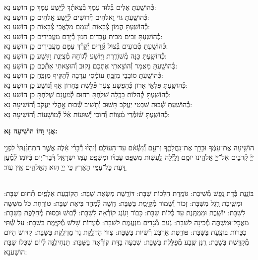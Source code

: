 \documentclass[twoside, openany, parskip=half, 11pt]{book}
\begin{document}
\begin{small}
כְּ֯הוֹשַֽׁעְתָּ אֵלִים בְּ֯לוּד עִמָּךְ בְּ֯צֵאתְ֯ךָ לְ֯יֵֽשַׁע עַמָּךְ \hfill כֵּן הוֹשַׁע נָא: \\
כְּ֯הוֹשַֽׁעְתָּ גּוֹי וֵאלֹהִים דְּ֯רוּשִׁים לְ֯יֵֽשַׁע אֱלֹהִים \hfill כֵּן הוֹשַׁע נָא: \\
כְּ֯הוֹשַֽׁעְתָּ הֲמוֹן צְ֯בָאוֹת וְ֯עִמָּם מַלְאֲכֵי צְ֯בָאוֹת \hfill כֵּן הוֹשַׁע נָא: \\
כְּ֯הוֹשַֽׁעְתָּ זַכִּים מִבֵּית עֲבָדִים חַנּוּן בְּ֯יָדָם מַעֲבִידִים \hfill כֵּן הוֹשַׁע נָא: \\
כְּ֯הוֹשַֽׁעְתָּ טְ֯בוּעִים בְּ֯צוּל גְּ֯זָרִים יְ֯קָרְ֯ךָ עִמָּם מַעֲבִירִים \hfill כֵּן הוֹשַׁע נָא: \\
כְּ֯הוֹשַֽׁעְתָּ כַּנָּה מְ֯שׁוֹרֶֽרֶת וַיּֽוֹשַׁע לְ֯גוֹחָהּ מְ֯צֻיֶּנֶת וַיִוָּֽשַׁע \hfill כֵּן הוֹשַׁע נָא: \\
כְּ֯הוֹשַֽׁעְתָּ מַאֲמַר וְ֯הוֹצֵאתִי אֶתְכֶם נָקוּב וְ֯הוּצֵאתִי אִתְּ֯כֶם \hfill כֵּן הוֹשַׁע נָא:\\
כְּ֯הוֹשַֽׁעְתָּ סוֹבֲבֵי מִזְבֵּֽחַ עוֹמְ֯סֵי עֲרָבָה לְ֯הַקִּיף מִזְבֵּֽחַ \hfill כֵּן הוֹשַׁע נָא: \\
כְּ֯הוֹשַֽׁעְתָּ פִּלְאֵי אָרוֹן כְּ֯הֻפְשַׁע צִעֵר פְּ֯לֶֽשֶׁת בַּחֲרוֹן אַף וְ֯נוֹשַׁע \hfill כֵּן הוֹשַׁע נָא:\\
כְּ֯הוֹשַֽׁעְתָּ קְ֯הִלּוֹת בָּבֶֽלָה שִׁלַּֽחְתָּ רַחוּם לְ֯מַעֲנָם שֻׁלַּחְתָּ \hfill כֵּן הוֹשַׁע נָא:\\

כְּ֯הוֹשַֽׁעְתָּ שְׁ֯בוּת שִׁבְטֵי יַעֲקֹב תָּשׁוּב וְ֯תָשִׁיב שְׁ֯בוּת אׇׇׇׇׇהֳלֵי יַעֲקֹב \hfill וְ֯הוֹשִׁיעָה נָּא:\\
כְּ֯הוֹשַֽׁעְתָּ שׁ֗וֹמְ֯רֵי מִ֗צְווֹת וְ֯֗חוֹכֵי יְ֯שׁוּעוֹת אֵ֗ל֗ לְ֯מוֹשָׁעוֹת \hfill וְ֯הוֹשִׁיעָה נָּא:

\end{small}

\begin{large}
\textbf{אֲנִי וָהוֹ הוֹשִֽׁיעָה נָּא:}
\end{large}

הוֹשִׁ֤יעָה אֶת־עַמֶּ֗ךָ וּבָרֵ֥ךְ אֶת־נַֽחֲלָתֶ֑ךָ וּֽרְעֵ֥ם וְ֯֝נַשְּׂ֯אֵ֗ם עַד־הָֽעוֹלָֽם׃ וְ֯יִֽהְי֨וּ דְ֯בָרַ֜י אֵ֗לֶּה אֲשֶׁ֤ר הִתְחַנַּ֨נְתִּי֙ לִפְנֵ֣י יְיָ֔ קְ֯רֹבִ֛ים אֶל־יְיָ֥ אֱלֹהֵ֖ינוּ יוֹמָ֣ם וָלָ֑יְ֯לָה לַֽעֲשׂ֣וֹת מִשְׁפַּ֣ט עַבְדּ֗וֹ וּמִשְׁפַּ֛ט עַמּ֥וֹ יִשְׂרָאֵ֖ל דְּ֯בַר־י֥וֹם בְּ֯יוֹמֽוֹ׃ לְ֯מַ֗עַן דַּ֚עַת כׇּל־עַמֵּ֣י הָאָ֔רֶץ כִּ֥י יְיָ֖ ה֣וּא הָֽאֱלֹהִ֑ים אֵ֖ין עֽוֹד׃

\sepline

\\
בּוֹנֶֽנֶת בְּ֯דָת נֶֽפֶשׁ מְ֯שִׁיבַת: גּוֹמֶֽרֶת הִלְכוֹת שַׁבָּת: דּוֹרֶֽשֶׁת מַשְׂאַת שַׁבָּת: הַקּוֹבַֽעַת אַלְפַּֽיִם תְּ֯חוּם שַׁבָּת: וּמְשִֽׁיבַת רֶֽגֶל מִשַּׁבָּת: זָכוֹר וְ֯שָׁמוֹר מְ֯קַיֶּֽמֶת בַּשַּׁבָּת: חָֽשָׁה לְ֯מַהֵר בִּיאַת שַׁבָּת: טוֹרַֽחַת כֹּל מִשִּׁשָּה לַשַּׁבָּת: יוֹשֶֽׁבֶת וּמַמְתֶּֽנֶת עַד כְּ֯לוֹת שַׁבָּת: כָּבוֹד וָעֹֽנֶג קוֹרְ֯אָה לַשַּׁבָּת: לְ֯בוּשׁ וּכְסוּת מְ֯חַלֶּֽפֶת בַּשַּׁבָּת: מַאֲכׇל־וּמִשְׁתֶּה מְ֯כִינָה לַשַּׁבָּת: נֹֽעַם מְ֯גָדִים מַנְעֶֽמֶת לַשַּׁבָּת: סְ֯עֻדּוֹת שָׁלֹשׁ מְ֯קַיֶּֽמֶת בַּשַּׁבָּת: עַל שְׁ֯תֵּי כִכָּרוֹת בּוֹצַֽעַת בַּשַּׁבָּת: פּוֹרֶֽטֶת אַרְבַּע רְ֯שֻׁיּוֹת בַּשַּׁבָּת: צִוּוּי הַדְלָֽקַת נֵר מַדְלֶֽקֶת בַּשַּׁבָּת: קִדּוּשׁ הַיּוֹם מְ֯קַדֶּֽשֶׁת בַּשַּׁבָּת: רֶֽנֶן שֶֽׁבַע מְ֯פַלֶּֽלֶת בַּשַּׁבָּת: שִׁבְעָה בַדָּת קוֹרְ֯אָה בַּשַּׁבָּת: תַּנְחִילֶֽנָּה לְ֯יוֹם שֶׁכֻּלּוֹ שַׁבָּת הוֹשַׁענָא:
\end{document}
